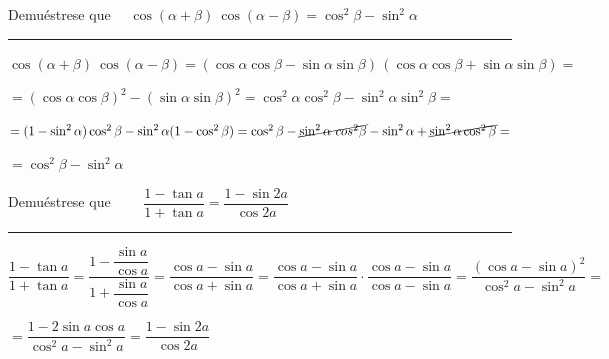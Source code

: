 \begin{miejercicio}

Demuéstrese que $\quad \cos(\alpha+\beta)\ \cos(\alpha-\beta)= \cos^2 \beta-\sin^2 \alpha$

\rule{250pt}{0.1pt}

\vspace{4mm}	
$\cos(\alpha+\beta)\ \cos(\alpha-\beta) = (\cos \alpha \cos \beta - \sin \alpha \sin \beta)\, (\cos \alpha \cos \beta + \sin \alpha \sin \beta)=$


\vspace{2mm} $=(\cos \alpha \cos \beta)^2 - (\sin \alpha \sin \beta)^2=  \cos^2 \alpha \cos^2 \beta - \sin^2 \alpha \sin^2 \beta= $

\vspace{2mm} $=(1-\sin^2 \alpha) \cos^2 \beta - \sin^2 \alpha (1-\cos^2 \beta)=
\cos^2 \beta- \cancel{\sin^2 \alpha \ cos^2 \beta} -\sin^2 \alpha +\cancel{\sin^2 \alpha \cos^2 \beta} = $

\vspace{2mm} $= \cos^2 \beta - \sin^2 \alpha$ \textcolor{gris}{\QED}
\end{miejercicio}


\begin{miejercicio}

Demuéstrese que $\qquad \dfrac{1-\tan a}{1+\tan a}=\dfrac{1-\sin2 a}{\cos2 a}$

\rule{250pt}{0.1pt}

\vspace{4mm}
	$\dfrac{1-\tan a}{1+\tan a}=\dfrac{1-\dfrac{\sin a}{\cos a}}{1+\dfrac{\sin a}{\cos a}}=\dfrac{\cos a - \sin a}{\cos a + \sin a}=
\dfrac{\cos a - \sin a}{\cos a + \sin a} \cdot \dfrac{\cos a - \sin a}{\cos a - \sin a}= \dfrac{(\cos a - \sin a)^2}{\cos^2 a  - \sin^2 a}=$

\vspace{2mm} $=\dfrac{1-2\sin a \cos a}{\cos^2 a  - \sin^2 a}=\dfrac{1-\sin 2a}{\cos 2a}$ \textcolor{gris}{\QED}
	
	
\end{miejercicio}


